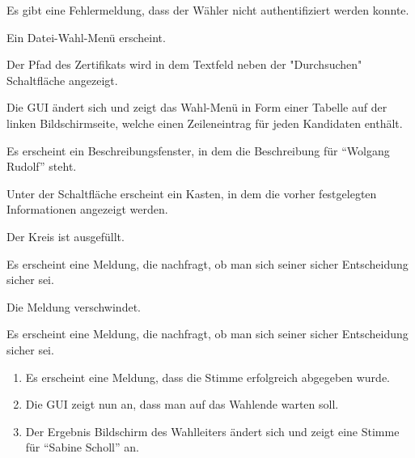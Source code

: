 \documentclass[parskip=full]{scrartcl}
\begin{document}
		{Es gibt eine Fehlermeldung, dass der Wähler nicht authentifiziert werden konnte.}

		{Ein Datei-Wahl-Menü erscheint.}
	
		{Der Pfad des Zertifikats wird in dem Textfeld neben der "Durchsuchen" Schaltfläche angezeigt.}
		
		{Die GUI ändert sich und zeigt das Wahl-Menü in Form einer Tabelle auf der linken Bildschirmseite, welche einen Zeileneintrag für jeden Kandidaten enthält.}

		{Es erscheint ein Beschreibungsfenster, in dem die Beschreibung für \enquote{Wolgang Rudolf} steht.}

		{Unter der Schaltfläche erscheint ein Kasten, in dem die vorher festgelegten Informationen angezeigt werden.}

		{Der Kreis ist ausgefüllt.}
	
		{Es erscheint eine Meldung, die nachfragt, ob man sich seiner sicher Entscheidung sicher sei.}

		{Die Meldung verschwindet.}
			
		{Es erscheint eine Meldung, die nachfragt, ob man sich seiner sicher Entscheidung sicher sei.}

		{\begin{enumerate}
			\item Es erscheint eine Meldung, dass die Stimme erfolgreich abgegeben wurde.
			\item Die GUI zeigt nun an, dass man auf das Wahlende warten soll.
			\item Der Ergebnis Bildschirm des Wahlleiters ändert sich und zeigt eine Stimme für \enquote{Sabine Scholl} an.
		\end{enumerate}}
\end{document}
